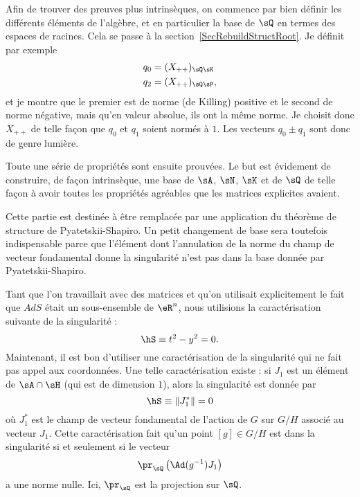 Afin de trouver des preuves plus intrinsèques, on commence par bien définir les différents éléments de l'algèbre, et en particulier la base de $\sQ$ en termes des espaces de racines. Cela se passe à la section~\ref{SecRebuildStructRoot}. Je définit par exemple
\begin{equation}
	\begin{aligned}[]
		q_0 & =(X_{++})_{\sQ\sK}  \\
		q_2 & =(X_{++})_{\sQ\sP},
	\end{aligned}
\end{equation}
et je montre que le premier est de norme (de Killing) positive et le second de norme négative, mais qu'en valeur absolue, ils ont la même norme. Je choisit donc $X_{++}$ de telle façon que $q_0$ et $q_1$ soient normés à $1$. Les vecteurs $q_0\pm q_1$ sont donc de genre lumière.

Toute une série de propriétés sont ensuite prouvées. Le but est évidement de construire, de façon intrinsèque, une base de $\sA$, $\sN$, $\sK$ et de $\sQ$ de telle façon à avoir toutes les propriétés agréables que les matrices explicites avaient.

Cette partie est destinée à être remplacée par une application du théorème de structure de Pyatetskii-Shapiro. Un petit changement de base sera toutefois indispensable parce que l'élément dont l'annulation de la norme du champ de vecteur fondamental donne la singularité n'est pas dans la base donnée par Pyatetskii-Shapiro.

Tant que l'on travaillait avec des matrices et qu'on utilisait explicitement le fait que $AdS$ était un sous-ensemble de $\eR^n$, nous utilisions la caractérisation suivante de la singularité :
\begin{equation}
	\hS\equiv t^2-y^2=0.
\end{equation}
Maintenant, il est bon d'utiliser une caractérisation de la singularité qui ne fait pas appel aux coordonnées. Une telle caractérisation existe : si $J_1$ est un élément de $\sA\cap\sH$ (qui est de dimension $1$), alors la singularité est donnée par
\begin{equation}
	\hS\equiv \| J_1^* \|=0
\end{equation}
où $J_1^*$ est le champ de vecteur fondamental de l'action de $G$ sur $G/H$ associé au vecteur $J_1$. Cette caractérisation fait qu'un point $[g]\in G/H$ est dans la singularité si et seulement si le vecteur
\begin{equation}		\label{VisiteEqprQcaract}
	\pr_{\sQ}\left( \Ad(g^{-1})J_1 \right)
\end{equation}
a une norme nulle. Ici, $\pr_{\sQ}$ est la projection sur $\sQ$.

